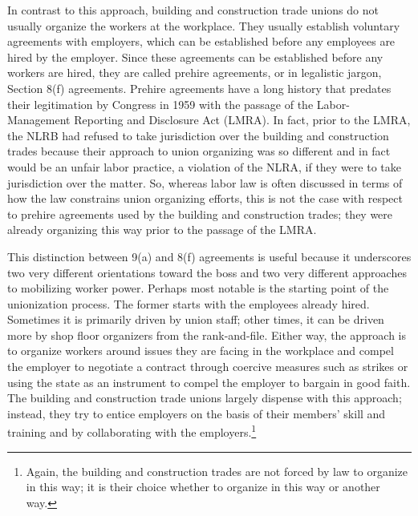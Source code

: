 \documentclass[12pt]{article}
\begin{document}
In contrast to this approach, building and construction trade unions do not usually organize the workers at the workplace. They usually establish voluntary agreements with employers, which can be established before any employees are hired by the employer. Since these agreements can be established before any workers are hired, they are called prehire agreements, or in legalistic jargon, Section 8(f) agreements. Prehire agreements have a long history that predates their legitimation by Congress in 1959 with the passage of the Labor-Management Reporting and Disclosure Act (LMRA). In fact, prior to the LMRA, the NLRB had refused to take jurisdiction over the building and construction trades because their approach to union organizing was so different and in fact would be an unfair labor practice, a violation of the NLRA, if they were to take jurisdiction over the matter. So, whereas labor law is often discussed in terms of how the law constrains union organizing efforts, this is not the case with respect to prehire agreements used by the building and construction trades; they were already organizing this way prior to the passage of the LMRA.

This distinction between 9(a) and 8(f) agreements is useful because it underscores two very different orientations toward the boss and two very different approaches to mobilizing worker power. Perhaps most notable is the starting point of the unionization process. The former starts with the employees already hired. Sometimes it is primarily driven by union staff; other times, it can be driven more by shop floor organizers from the rank-and-file. Either way, the approach is to organize workers around issues they are facing in the workplace and compel the employer to negotiate a contract through coercive measures such as strikes or using the state as an instrument to compel the employer to bargain in good faith. The building and construction trade unions largely dispense with this approach; instead, they try to entice employers on the basis of their members’ skill and training and by collaborating with the employers.\footnote{Again, the building and construction trades are not forced by law to organize in this way; it is their choice whether to organize in this way or another way.}
\end{document}
